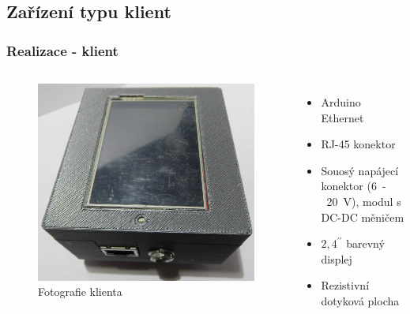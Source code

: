 \documentclass{beamer}
\begin{document}
\subsection{Zařízení typu klient}
\begin{frame}
\frametitle{Realizace - klient}
\begin{columns}[c]
	\begin{figure}
		\centering
		\includegraphics[width=\textwidth]{img/client_realizace.jpg}
		\caption{Fotografie klienta}
	\end{figure}
%
 		\begin{itemize}
 			\item Arduino Ethernet
 			\item RJ-45 konektor
 			\item Souosý napájecí konektor (6~-~20~V), modul s DC-DC měničem
 			\item $2,4^{\prime\prime}$ barevný displej
 			\item Rezistivní dotyková plocha
 		\end{itemize}	
\end{columns}
\end{frame}
\end{document}
